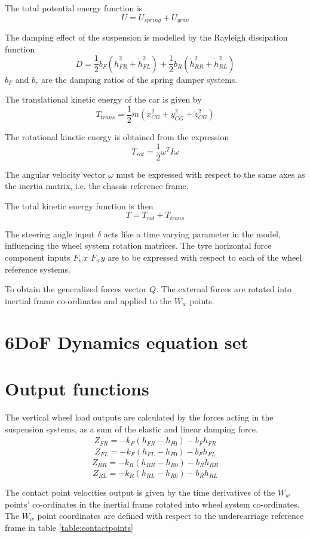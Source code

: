 The total potential energy function is
$$ U = U_{spring} + U_{grav} $$

The damping effect of the suspension is modelled by the Rayleigh dissipation function
$$ D = \frac{1}{2} b_F (\dot h_{FR}^2 + \dot h_{FL}^2) + \frac{1}{2} b_R (\dot h_{RR}^2 + \dot h_{RL}^2) $$
$b_F$ and $b_r$ are the damping ratios of the spring damper systems. 

The translational kinetic energy of the car is given by
$$ T_{trans} = \frac{1}{2} m (\dot x_{CG}^2 +\dot y_{CG}^2 +\dot z_{CG}^2 ) $$

The rotational kinetic energy is obtained from the expression
$$ T_{rot} = \frac{1}{2}\omega^T I \omega $$

The angular velocity vector $\omega$ must be expressed with respect to the same axes as the inertia matrix, i.e. the chassis reference frame.

The total kinetic energy function is then
$$ T = T_{rot} + T_{trans} $$

The steering angle input $\delta$ acts like a time varying parameter in the model, influencing the wheel system rotation matrices.
The tyre horizontal force component inputs $F_wx$ $F_wy$ are to be expressed with respect to each of the wheel reference systems.

To obtain the generalized forces vector $Q$. The external forces are rotated into inertial frame co-ordinates and applied to the $W_w$ points.

\section{6DoF Dynamics equation set}
\label{sec:6dofeq}

\section{Output functions}
\label{sec:6dofout}
The vertical wheel load outputs are calculated by the forces acting in the suspension systems, as a sum of the elastic and linear damping force.
$$Z_{FR} = - k_F (h_{FR} - h_{F0}) - b_F \dot h_{FR} $$
$$Z_{FL} = - k_F (h_{FL} - h_{F0}) - b_F \dot h_{FL} $$
$$Z_{RR} = - k_R (h_{RR} - h_{R0}) - b_R \dot h_{RR} $$
$$Z_{RL} = - k_R (h_{RL} - h_{R0}) - b_R \dot h_{RL} $$

The contact point velocities output is given by the time derivatives of the $W_w$ points' co-ordinates in the inertial frame rotated into wheel system co-ordinates. The $W_w$ point coordinates are defined with respect to the undercarriage reference frame in table \ref{table:contactpoints}

